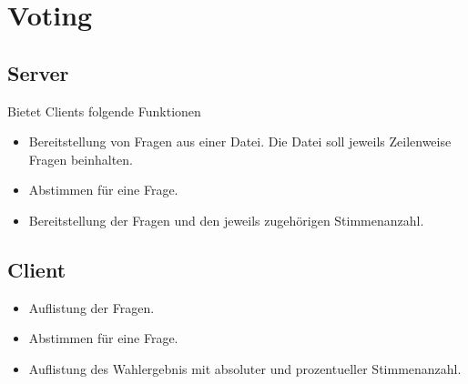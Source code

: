 \documentclass{article}
\begin{document}

\section{Voting}

\subsection{Server}

Bietet Clients folgende Funktionen

\begin{itemize}
	\item Bereitstellung von Fragen aus einer Datei. Die Datei soll jeweils Zeilenweise Fragen beinhalten.
	\item Abstimmen f\"ur eine Frage.
	\item Bereitstellung der Fragen und den jeweils zugeh\"origen Stimmenanzahl.
\end{itemize}

\subsection{Client}

\begin{itemize}
	\item Auflistung der Fragen.
	\item Abstimmen f\"ur eine Frage.
	\item Auflistung des Wahlergebnis mit absoluter und prozentueller Stimmenanzahl.
\end{itemize}
\end{document}
